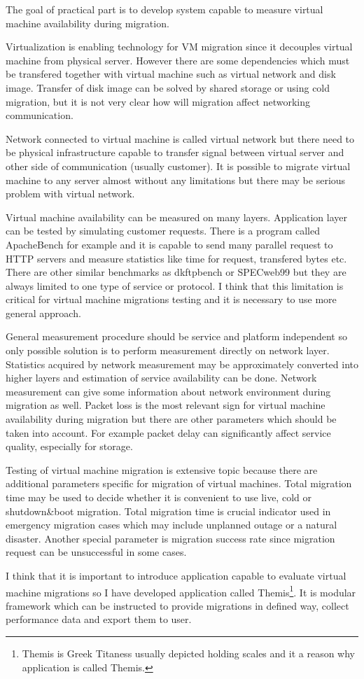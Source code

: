 
The goal of practical part is to develop system capable to measure virtual machine availability during migration. 

Virtualization is enabling technology for \Ac{VM} migration since it decouples virtual machine from physical server. However there are some dependencies which must be transfered together with virtual machine such as virtual network and disk image. Transfer of disk image can be solved by shared storage or using cold migration, but it is not very clear how will migration affect networking communication.

Network connected to virtual machine is called virtual network but there need to be physical infrastructure capable to transfer signal between virtual server and other side of communication (usually customer). It is possible to migrate virtual machine to any server almost without any limitations but there may be serious problem with virtual network. 

Virtual machine availability can be measured on many layers. Application layer can be tested by simulating customer requests. There is a program called ApacheBench for example and it is capable to send many parallel request to \Ac{HTTP} servers and measure statistics like time for request, transfered bytes etc. There are other similar benchmarks as dkftpbench or SPECweb99 but they are always limited to one type of service or protocol. I think that this limitation is critical for virtual machine migrations testing and it is necessary to use more general approach.

General measurement procedure should be service and platform independent so only possible solution is to perform measurement directly on network layer. Statistics acquired by network measurement may be approximately converted into higher layers and estimation of service availability can be done. Network measurement can give some information about network environment during migration as well. Packet loss is the most relevant sign for virtual machine availability during migration but there are other parameters which should be taken into account. For example packet delay can significantly affect service quality, especially for storage.

Testing of virtual machine migration is extensive topic because there are additional parameters specific for migration of virtual machines. Total migration time may be used to decide whether it is convenient to use live, cold or shutdown\&boot migration. Total migration time is crucial indicator used in emergency migration cases which may include unplanned outage or a natural disaster. Another special parameter is migration success rate since migration request can be unsuccessful in some cases.

I think that it is important to introduce application capable to evaluate virtual machine migrations so I have developed application called Themis\footnote{Themis is Greek Titaness usually depicted holding scales and it a reason why application is called Themis.}. It is modular framework which can be instructed to provide migrations in defined way, collect performance data and export them to user.
